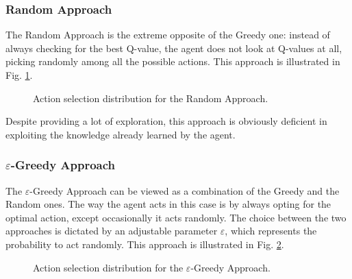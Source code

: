 \documentclass[a4paper, 12pt]{article}
\numberwithin{equation}{section}
\begin{document}
\subsubsection{Random Approach}

The Random Approach is the extreme opposite of the Greedy one: instead of always checking for the best Q-value, the agent does not look at Q-values at all, picking randomly among all the possible actions. This approach is illustrated in Fig. \ref{fig:random}.

\begin{figure}[h]
	\centering
		\caption{Action selection distribution for the Random Approach.}
	\label{fig:random}
\end{figure}

Despite providing a lot of exploration, this approach is obviously deficient in exploiting the knowledge already learned by the agent.


\subsubsection{$\varepsilon$-Greedy Approach}

The $\varepsilon$-Greedy Approach can be viewed as a combination of the Greedy and the Random ones. The way the agent acts in this case is by always opting for the optimal action, except occasionally it acts randomly. The choice between the two approaches is dictated by an adjustable parameter $\varepsilon$, which represents the probability to act randomly. This approach is illustrated in Fig. \ref{fig:epsilon}.

\begin{figure}[h]
	\centering
		\caption{Action selection distribution for the $\varepsilon$-Greedy Approach.}
	\label{fig:epsilon}
\end{figure}
\end{document}
